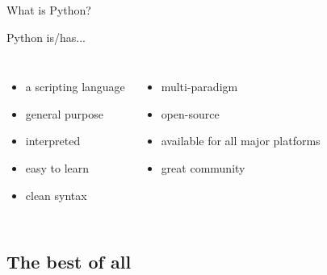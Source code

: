 \begin{frame}{What is Python?}

Python is/has...

\begin{columns}[t]


\begin{itemize}
	\item a scripting language
	\item general purpose
	\item interpreted
	\item easy to learn
	\item clean syntax
\end{itemize}


\begin{itemize}
	\item multi-paradigm
	\item open-source
	\item available for all major platforms
	\item great community
\end{itemize}

\end{columns}

\end{frame}

\subsection{The best of all}


